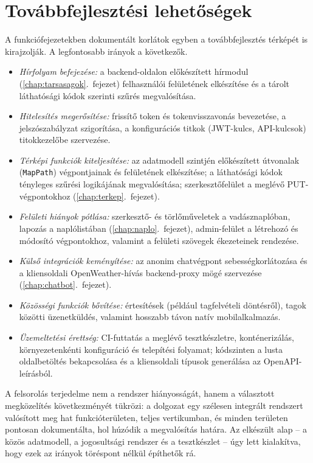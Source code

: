 \section{Továbbfejlesztési lehetőségek}
\label{sec:ossz-tovabbfejlesztes}

A funkciófejezetekben dokumentált korlátok egyben a továbbfejlesztés térképét is kirajzolják.
A legfontosabb irányok a következők.

\begin{itemize}
	\item \emph{Hírfolyam befejezése:} a backend-oldalon előkészített hírmodul
	      (\ref{chap:tarsasagok}.~fejezet) felhasználói felületének elkészítése és a tárolt
	      láthatósági kódok szerinti szűrés megvalósítása.
	\item \emph{Hitelesítés megerősítése:} frissítő token és tokenvisszavonás bevezetése, a
	      jelszószabályzat szigorítása, a konfigurációs titkok (JWT-kulcs, API-kulcsok)
	      titokkezelőbe szervezése.
	\item \emph{Térképi funkciók kiteljesítése:} az adatmodell szintjén előkészített útvonalak
	      (\texttt{MapPath}) végpontjainak és felületének elkészítése; a láthatósági kódok
	      tényleges szűrési logikájának megvalósítása; szerkesztőfelület a meglévő
	      PUT-végpontokhoz (\ref{chap:terkep}.~fejezet).
	\item \emph{Felületi hiányok pótlása:} szerkesztő- és törlőműveletek a vadásznaplóban,
	      lapozás a naplólistában (\ref{chap:naplo}.~fejezet), admin-felület a létrehozó és
	      módosító végpontokhoz, valamint a felületi szövegek ékezeteinek rendezése.
	\item \emph{Külső integrációk keményítése:} az anonim chatvégpont sebességkorlátozása és a
	      kliensoldali OpenWeather-hívás backend-proxy mögé szervezése
	      (\ref{chap:chatbot}.~fejezet).
	\item \emph{Közösségi funkciók bővítése:} értesítések (például tagfelvételi döntésről),
	      tagok közötti üzenetküldés, valamint hosszabb távon natív mobilalkalmazás.
	\item \emph{Üzemeltetési érettség:} CI-futtatás a meglévő tesztkészletre, konténerizálás,
	      környezetenkénti konfiguráció és telepítési folyamat; kódszinten a lusta
	      oldalbetöltés bekapcsolása és a kliensoldali típusok generálása az
	      OpenAPI-leírásból.
\end{itemize}

A felsorolás terjedelme nem a rendszer hiányosságát, hanem a választott megközelítés
következményét tükrözi: a dolgozat egy szélesen integrált rendszert valósított meg hat
funkcióterületen, teljes vertikumban, és minden területen pontosan dokumentálta, hol húzódik a
megvalósítás határa. Az elkészült alap -- a közös adatmodell, a jogosultsági rendszer és a
tesztkészlet -- úgy lett kialakítva, hogy ezek az irányok töréspont nélkül építhetők rá.
